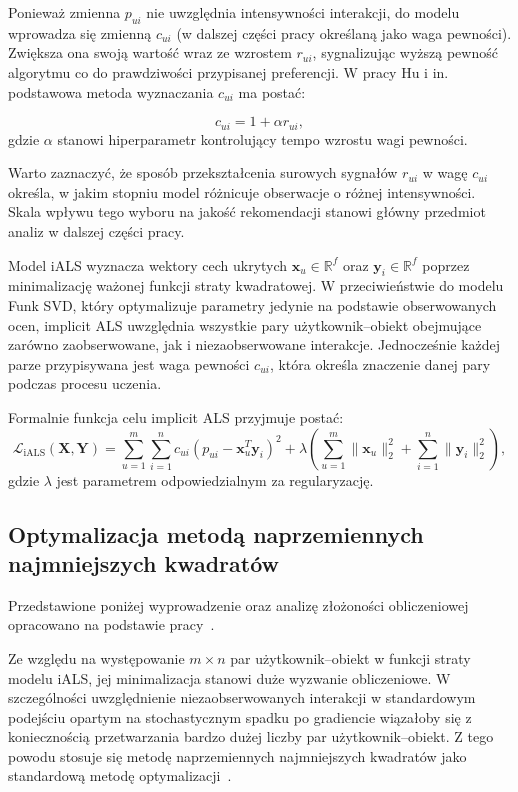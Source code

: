 Ponieważ zmienna $p_{ui}$ nie uwzględnia intensywności interakcji, do modelu wprowadza się zmienną $c_{ui}$ (w dalszej części pracy określaną jako waga pewności). Zwiększa ona swoją wartość wraz ze wzrostem $r_{ui}$, sygnalizując wyższą pewność algorytmu co do prawdziwości przypisanej preferencji. W pracy Hu i in.~\cite{hu2008implicit} podstawowa metoda wyznaczania $c_{ui}$ ma postać:

\begin{equation}
    c_{ui} = 1 + \alpha r_{ui},
\end{equation}
gdzie $\alpha$ stanowi hiperparametr kontrolujący tempo wzrostu wagi pewności.

Warto zaznaczyć, że sposób przekształcenia surowych sygnałów $r_{ui}$ w wagę $c_{ui}$ określa, w jakim stopniu model różnicuje obserwacje o różnej intensywności. Skala wpływu tego wyboru na jakość rekomendacji stanowi
główny przedmiot analiz w dalszej części pracy.

Model iALS wyznacza wektory cech ukrytych $\mathbf{x}_u \in \mathbb{R}^f$ oraz $\mathbf{y}_i \in \mathbb{R}^f$ poprzez minimalizację ważonej funkcji straty kwadratowej. W przeciwieństwie do modelu Funk SVD, który optymalizuje parametry jedynie na podstawie obserwowanych ocen, implicit ALS uwzględnia wszystkie pary użytkownik--obiekt obejmujące zarówno zaobserwowane, jak i niezaobserwowane interakcje. Jednocześnie każdej parze przypisywana jest waga pewności $c_{ui}$, która określa znaczenie danej pary podczas procesu uczenia.

Formalnie funkcja celu implicit ALS przyjmuje postać:
\begin{equation}
    \mathcal{L}_{\text{iALS}}(\mathbf{X}, \mathbf{Y}) = \sum_{u=1}^{m} \sum_{i=1}^{n} c_{ui} \left( p_{ui} - \mathbf{x}_u^T     \mathbf{y}_i \right)^2 + \lambda \left( \sum_{u=1}^{m} \|\mathbf{x}_u\|_2^2 + \sum_{i=1}^{n} \|\mathbf{y}_i\|_2^2 \right),
\end{equation}
gdzie $\lambda$ jest parametrem odpowiedzialnym za regularyzację.

\subsection{Optymalizacja metodą naprzemiennych najmniejszych kwadratów}

Przedstawione poniżej wyprowadzenie oraz analizę złożoności obliczeniowej opracowano na podstawie pracy~\cite{hu2008implicit}.

Ze względu na występowanie $m \times n$ par użytkownik--obiekt w funkcji straty modelu iALS, jej minimalizacja stanowi duże wyzwanie obliczeniowe. W szczególności uwzględnienie niezaobserwowanych interakcji w standardowym podejściu opartym na stochastycznym spadku po gradiencie wiązałoby się z koniecznością przetwarzania bardzo dużej liczby par użytkownik--obiekt. Z tego powodu stosuje się metodę naprzemiennych najmniejszych kwadratów jako standardową metodę optymalizacji~\cite{hu2008implicit}.

